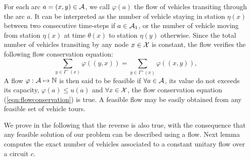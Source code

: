 \medskip
For each arc $a =(x,y) \in \mathcal{A}$, we call $\varphi(a)$ the flow of vehicles transiting through the arc $a$. 
It can be interpreted as the number of vehicle staying in station $\eta(x)$ between two consecutive time-steps if $a \in \mathcal{A}_1$, or the number of vehicle moving from station $\eta(x)$ at time $\theta(x)$ to station $\eta(y)$ otherwise.
Since the total number of vehicles transiting by any node $x \in \mathcal{X}$ is constant, the flow verifies the following flow conservation equation:
\begin{equation}\label{eqn:flowconservation}
\sum_{{y\in \Gamma^-(x)}} \varphi((y,x))= \sum_{{y\in \Gamma^+(x)}} \varphi((x,y)),
\end{equation}
A flow $\varphi:\mathcal{A} \mapsto \mathbb{N}$ is then said to be feasible if $\forall a \in \mathcal{A}$, its value do not exceeds its capacity, \ie $\varphi(a) \leq u(a)$ and $\forall x \in \mathcal{X}$, the flow conservation equation (\ref{eqn:flowconservation}) is true.
A feasible flow may be easily obtained from any feasible set of vehicle tours.

\medskip
We prove in the following that the reverse is also true, with the consequence that any feasible solution of our problem can be described using a flow.
Next lemma computes the exact number of vehicles associated to a constant unitary flow over a circuit $c$.

